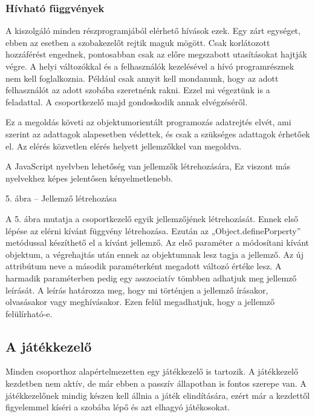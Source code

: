 \documentclass[]{article}
\begin{document}
\hypertarget{huxedvhatuxf3-fuxfcggvuxe9nyek}{%
\subsubsection{Hívható
függvények}\label{huxedvhatuxf3-fuxfcggvuxe9nyek}}

A kiszolgáló minden részprogramjából elérhető hívások ezek. Egy zárt
egységet, ebben az esetben a szobakezelőt rejtik maguk mögött. Csak
korlátozott hozzáférést engednek, pontosabban csak az előre megszabott
utasításokat hajtják végre. A helyi változókkal és a felhasználók
kezelésével a hívó programrésznek nem kell foglalkoznia. Például csak
annyit kell mondanunk, hogy az adott felhasználót az adott szobába
szeretnénk rakni. Ezzel mi végeztünk is a feladattal. A csoportkezelő
majd gondoskodik annak elvégzéséről.

Ez a megoldás követi az objektumorientált programozás adatrejtés elvét,
ami szerint az adattagok alapesetben védettek, és csak a szükséges
adattagok érhetőek el. Az elérés közvetlen elérés helyett jellemzőkkel
van megoldva.

A JavaScript nyelvben lehetőség van jellemzők létrehozására, Ez viszont
más nyelvekhez képes jelentősen kényelmetlenebb.

5. ábra -- Jellemző létrehozása

A 5. ábra mutatja a csoportkezelő egyik jellemzőjének létrehozását.
Ennek első lépése az elérni kívánt függvény létrehozása. Ezután az
„Object.definePorperty'' metódussal készíthető el a kívánt jellemző. Az
első paraméter a módosítani kívánt objektum, a végrehajtás után ennek az
objektumnak lesz tagja a jellemző. Az új attribútum neve a második
paraméterként megadott változó értéke lesz. A harmadik paraméterben
pedig egy asszociatív tömbben adhatjuk meg jellemző leírását. A leírás
határozza meg, hogy mi történjen a jellemző írásakor, olvasásakor vagy
meghívásakor. Ezen felül megadhatjuk, hogy a jellemző felülírható-e.

\hypertarget{a-juxe1tuxe9kkezelux151}{%
\subsection{A játékkezelő}\label{a-juxe1tuxe9kkezelux151}}

Minden csoporthoz alapértelmezetten egy játékkezelő is tartozik. A
játékkezelő kezdetben nem aktív, de már ebben a passzív állapotban is
fontos szerepe van. A játékkezelőnek mindig készen kell állnia a játék
elindítására, ezért már a kezdettől figyelemmel kíséri a szobába lépő és
azt elhagyó játékosokat.
\end{document}
